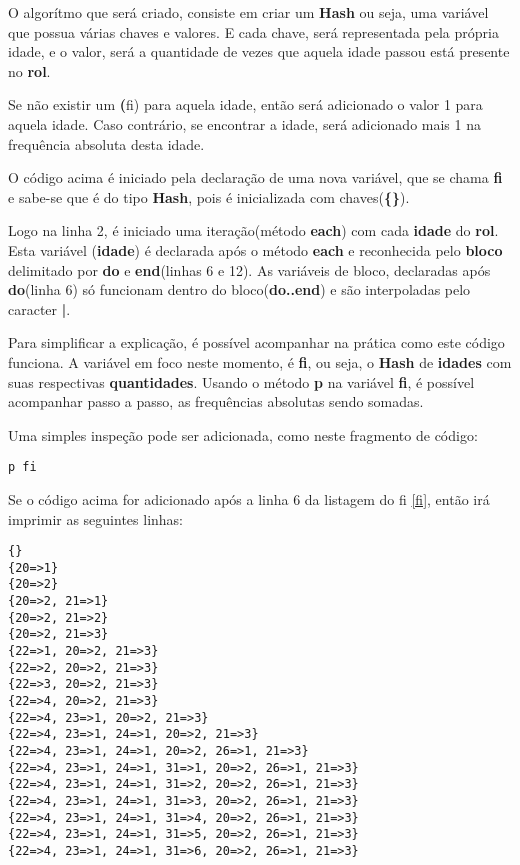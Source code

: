 \documentclass[espaco=simples,appendix=Name]{abnt}
\begin{document}
O algorítmo que será criado, consiste em criar um \textbf{Hash} ou seja, uma variável que possua várias chaves e valores. E cada chave, será representada pela própria idade, e o valor, será a quantidade de vezes que aquela idade passou está presente no \textbf{rol}. 

Se não existir um \textbf(fi) para aquela idade, então será adicionado o valor 1 para aquela idade.
Caso contrário, se encontrar a idade, será adicionado mais 1 na frequência absoluta desta idade.

 

O código acima é iniciado pela declaração de uma nova variável, que se chama \textbf{fi} e sabe-se que é do tipo \textbf{Hash}, pois é inicializada com chaves(\textbf{\{\}}). 

Logo na linha 2, é iniciado uma iteração(método \textbf{each}) com cada \textbf{idade} do \textbf{rol}. Esta variável (\textbf{idade}) é declarada após o método \textbf{each} e reconhecida pelo \textbf{bloco} delimitado por \textbf{do} e \textbf{end}(linhas 6 e 12). As variáveis de bloco, declaradas após \textbf{do}(linha 6) só funcionam dentro do bloco(\textbf{do..end}) e são interpoladas pelo caracter \textbf{|}.

Para simplificar a explicação, é possível acompanhar na prática como este código funciona. A variável em foco neste momento, é \textbf{fi}, ou seja, o \textbf{Hash} de \textbf{idades} com suas respectivas \textbf{quantidades}.
 Usando o método \textbf{p} na variável \textbf{fi}, é possível acompanhar passo a passo, as frequências absolutas sendo somadas.

Uma simples inspeção pode ser adicionada, como neste fragmento de código:

\begin{lstlisting}[caption=Inspecionando a soma dos elementos, emph=2]
  p fi
\end{lstlisting}

Se o código acima for adicionado após a linha 6 da listagem do fi \ref{fi}, então irá imprimir as seguintes linhas:

\begin{lstlisting}[caption=inspeção da variável \textbf{fi} ]
{}
{20=>1}
{20=>2}
{20=>2, 21=>1}
{20=>2, 21=>2}
{20=>2, 21=>3}
{22=>1, 20=>2, 21=>3}
{22=>2, 20=>2, 21=>3}
{22=>3, 20=>2, 21=>3}
{22=>4, 20=>2, 21=>3}
{22=>4, 23=>1, 20=>2, 21=>3}
{22=>4, 23=>1, 24=>1, 20=>2, 21=>3}
{22=>4, 23=>1, 24=>1, 20=>2, 26=>1, 21=>3}
{22=>4, 23=>1, 24=>1, 31=>1, 20=>2, 26=>1, 21=>3}
{22=>4, 23=>1, 24=>1, 31=>2, 20=>2, 26=>1, 21=>3}
{22=>4, 23=>1, 24=>1, 31=>3, 20=>2, 26=>1, 21=>3}
{22=>4, 23=>1, 24=>1, 31=>4, 20=>2, 26=>1, 21=>3}
{22=>4, 23=>1, 24=>1, 31=>5, 20=>2, 26=>1, 21=>3}
{22=>4, 23=>1, 24=>1, 31=>6, 20=>2, 26=>1, 21=>3}
\end{lstlisting}
\end{document}
